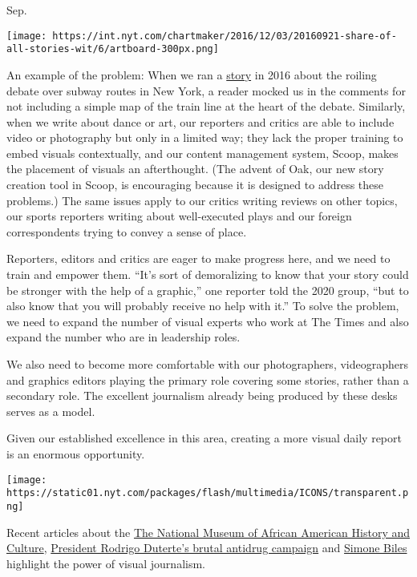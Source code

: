 Sep.

\texttt{[image: https://int.nyt.com/chartmaker/2016/12/03/20160921-share-of-all-stories-wit/6/artboard-300px.png]}

An example of the problem: When we ran a
\href{https://www.nytimes.com/2016/05/23/nyregion/f-train-express-plan-brings-anger-and-joy-depending-on-the-neighborhood.html}{story}
in 2016 about the roiling debate over subway routes in New York, a
reader mocked us in the comments for not including a simple map of the
train line at the heart of the debate. Similarly, when we write about
dance or art, our reporters and critics are able to include video or
photography but only in a limited way; they lack the proper training to
embed visuals contextually, and our content management system, Scoop,
makes the placement of visuals an afterthought. (The advent of Oak, our
new story creation tool in Scoop, is encouraging because it is designed
to address these problems.) The same issues apply to our critics writing
reviews on other topics, our sports reporters writing about
well-executed plays and our foreign correspondents trying to convey a
sense of place.

Reporters, editors and critics are eager to make progress here, and we
need to train and empower them. ``It's sort of demoralizing to know that
your story could be stronger with the help of a graphic,'' one reporter
told the 2020 group, ``but to also know that you will probably receive
no help with it.'' To solve the problem, we need to expand the number of
visual experts who work at The Times and also expand the number who are
in leadership roles.

We also need to become more comfortable with our photographers,
videographers and graphics editors playing the primary role covering
some stories, rather than a secondary role. The excellent journalism
already being produced by these desks serves as a model.

Given our established excellence in this area, creating a more visual
daily report is an enormous opportunity.

\texttt{[image: https://static01.nyt.com/packages/flash/multimedia/ICONS/transparent.png]}

Recent articles about the
\href{https://www.nytimes.com/interactive/2016/09/15/arts/design/national-museum-of-african-american-history-and-culture.html}{The
National Museum of African American History and Culture},
\href{https://www.nytimes.com/interactive/2016/12/07/world/asia/rodrigo-duterte-philippines-drugs-killings.html}{President
Rodrigo Duterte's brutal antidrug campaign} and
\href{https://www.nytimes.com/interactive/2016/08/05/sports/olympics-gymnast-simone-biles.html}{Simone
Biles} highlight the power of visual journalism.

